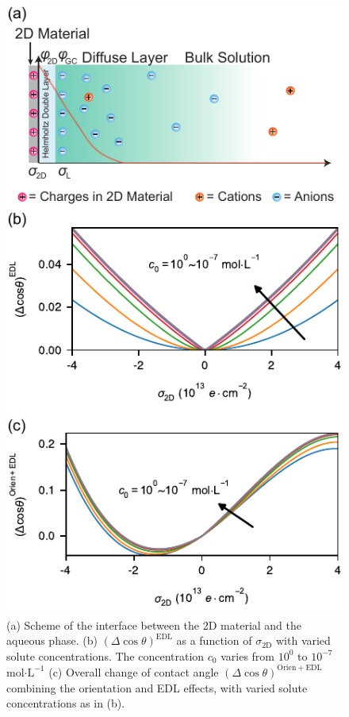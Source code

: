 \documentclass[journal=jacsat,manuscript=article,email=true,hyperref=true,keywords=true]{achemso}
\begin{document}
\begin{figure}[htbp]
\centering
\includegraphics[width=0.5\linewidth]{../img/2d-ph-dependency+MD.pdf}
\caption{\label{fig:res-EDL}
(a) Scheme of the interface between the 2D material and the aqueous phase. (b) \((\Delta\cos\theta)^{\mathrm{EDL}}\) as a function of \(\sigma_{\mathrm{2D}}\) with varied solute concentrations. The concentration \(c_{0}\) varies from \(10^{0}\) to \(10^{-7}\) mol\(\cdot\mathrm{L}^{-1}\) (c) Overall change of contact angle \((\Delta \cos \theta)^{\mathrm{Orien+EDL}}\) combining the orientation and EDL effects, with varied solute concentrations as in (b).}
\end{figure}
\end{document}
